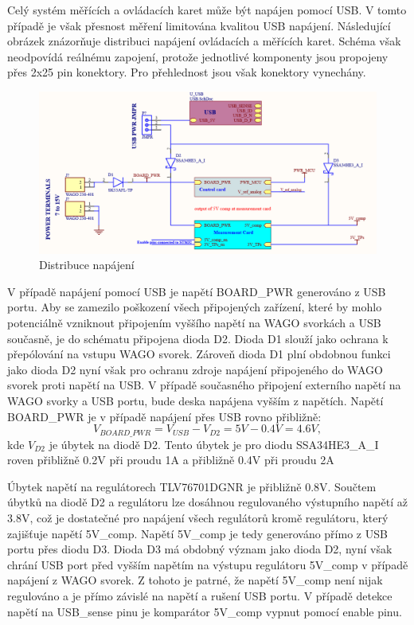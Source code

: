     Celý systém měřících a ovládacích karet může být napájen pomocí USB. V tomto případě je však přesnost
    měření limitována kvalitou USB napájení. Následující obrázek znázorňuje distribuci napájení
    ovládacích a měřících karet. Schéma však neodpovídá reálnému zapojení, protože jednotlivé
    komponenty jsou propojeny přes 2x25 pin konektory. Pro přehlednost jsou však konektory vynechány.
    \clearpage


    \begin{figure}[ht!]
        \centering
        \includegraphics[width = 1\textwidth]{obrazky/USB_power_distr.png}
        \caption{Distribuce napájení}
        \label{fig:Distribuce napájení}
    \end{figure}

    V případě napájení pomocí USB je napětí BOARD\_PWR generováno z USB portu.
    Aby se zamezilo poškození všech připojených zařízení, které by mohlo potenciálně vzniknout připojením
    vyššího napětí na WAGO svorkách a USB současně, je do schématu připojena dioda D2. Dioda D1
    slouží jako ochrana k přepólování na vstupu WAGO svorek. Zároveň dioda D1 plní obdobnou funkci jako dioda D2
    nyní však pro ochranu zdroje napájení připojeného do WAGO svorek proti napětí na USB.
    V případě současného připojení externího napětí na WAGO svorky a USB portu, bude deska napájena
    vyšším z napětích.
    Napětí BOARD\_PWR je v případě napájení přes USB rovno přibližně:
    \begin{equation}
        V_{BOARD\_PWR} = V_{USB} - V_{D2} = 5V - 0.4V = 4.6V,
    \end{equation}
    kde $V_{D2}$ je úbytek na diodě D2. Tento úbytek je pro diodu SSA34HE3\_A\_I roven přibližně 0.2V při proudu 1A
    a přibližně 0.4V při proudu 2A\par

    Úbytek napětí na regulátorech TLV76701DGNR je přibližně 0.8V.
    Součtem úbytků na diodě D2 a regulátoru lze 
    dosáhnou regulovaného výstupního napětí až 3.8V, což je dostatečné pro napájení všech regulátorů
    kromě regulátoru, který zajišťuje napětí 5V\_comp. Napětí 5V\_comp je tedy generováno přímo z USB portu přes 
    diodu D3. Dioda D3 má obdobný význam jako dioda D2, nyní však chrání USB port před vyšším napětím na výstupu
    regulátoru 5V\_comp v případě napájení z WAGO svorek. Z tohoto je patrné, že napětí 5V\_comp není nijak regulováno
    a je přímo závislé na napětí a rušení USB portu.
    V případě detekce napětí na USB\_sense pinu je komparátor 5V\_comp vypnut pomocí enable pinu.\par

